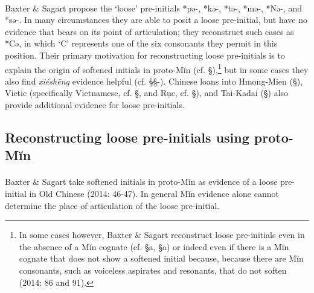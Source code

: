 \paragraph{}
\label{par:reconstructing-loose-pre-initials}
Baxter \& Sagart propose the `loose' pre-initials *pə-, *kə-, *tə-,
*mə-, *Nə-, and *sə-. In many circumstances they are able to posit a
loose pre-initial, but have no evidence that bears on its point of
articulation; they reconstruct such cases as *Cə, in which `C'
represents one of the six consonants they permit in this position. Their
primary motivation for reconstructing loose pre-initials is to explain
the origin of softened initials in proto-Mĭn (cf. §),\footnote{In some
  cases however, Baxter \& Sagart reconstruct loose pre-initials even in
  the absence of a Mĭn cognate (cf. §a, §a) or indeed even if there is a
  Mĭn cognate that does not show a softened initial because, because
  there are Mĭn consonants, such as voiceless aspirates and resonants,
  that do not soften (2014: 86 and 91).} but in some cases they also
find  \emph{xiéshēng} evidence helpful (cf. §§-). Chinese loans into
Hmong-Mien (§), Vietic (specifically Vietnamese, cf. §, and Rục, cf. §),
and Tai-Kadai (§) also provide additional evidence for loose
pre-initials.

\subsection{Reconstructing loose pre-initials using
proto-Mĭn}\label{reconstructing-loose-pre-initials-using-proto-mux12dn}

\paragraph{}Baxter \& Sagart take softened initials in proto-Mǐn as evidence of a
loose pre-initial in Old Chinese (2014: 46-47). In general Mǐn evidence
alone cannot determine the place of articulation of the loose
pre-initial.

